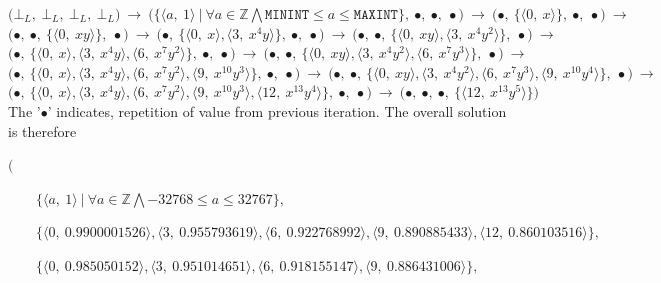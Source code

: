 \documentclass[final,3p, review, times]{Elsevier/elsarticle}
\begin{document}
\noindent
$
\bigg(\bot_L,\ \bot_L,\ \bot_L,\ \bot_L\bigg)\ \to\ 
\bigg(\Big\{\big\langle a,\ 1\big\rangle\ \big|\ \forall a\in\mathbb{Z}\bigwedge\mathtt{MININT}\leq a\leq\mathtt{MAXINT}\Big\},\ \bullet,\ \bullet,\ \bullet\bigg)\ \to\ 
\bigg(\bullet,\ \Big\{\big\langle 0,\ x\big\rangle\Big\},\ \bullet,\ \bullet\bigg)\ \to
$\\
$
\bigg(\bullet,\ \bullet,\ \Big\{\big\langle 0,\ xy\big\rangle\Big\},\ \bullet\bigg)\ \to\ 
\bigg(\bullet,\ \Big\{\big\langle 0,\ x\big\rangle,\big\langle 3,\ x^4y\big\rangle\Big\},\ \bullet,\ \bullet\bigg)\ \to\ 
\bigg(\bullet,\ \bullet,\ \Big\{\big\langle 0,\ xy\big\rangle,\big\langle 3,\ x^4y^2\big\rangle\Big\},\ \bullet\bigg)\ \to\ 
$\\
$
\bigg(\bullet,\ \Big\{\big\langle 0,\ x\big\rangle,\big\langle 3,\ x^4y\big\rangle,\big\langle 6,\ x^7y^2\big\rangle\Big\},\ \bullet,\ \bullet\bigg)\ \to\ 
\bigg(\bullet,\ \bullet,\ \Big\{\big\langle 0,\ xy\big\rangle,\big\langle 3,\ x^4y^2\big\rangle,\big\langle 6,\ x^7y^3\big\rangle\Big\},\ \bullet\bigg)\ \to\ 
$\\
$
\bigg(\bullet,\ \Big\{\big\langle 0,\ x\big\rangle,\big\langle 3,\ x^4y\big\rangle,\big\langle 6,\ x^7y^2\big\rangle,\big\langle 9,\ x^{10}y^3\big\rangle\Big\},\ \bullet,\ \bullet\bigg)\ \to\ 
\bigg(\bullet,\ \bullet,\ \Big\{\big\langle 0,\ xy\big\rangle,\big\langle 3,\ x^4y^2\big\rangle,\big\langle 6,\ x^7y^3\big\rangle,\big\langle 9,\ x^{10}y^4\big\rangle\Big\},\ \bullet\bigg)\ \to\ 
$\\
$
\bigg(\bullet,\ \Big\{\big\langle 0,\ x\big\rangle,\big\langle 3,\ x^4y\big\rangle,\big\langle 6,\ x^7y^2\big\rangle,\big\langle 9,\ x^{10}y^3\big\rangle,\big\langle 12,\ x^{13}y^4\big\rangle\Big\},\ \bullet,\ \bullet\bigg)\ \to\ 
\bigg(\bullet,\ \bullet,\ \bullet,\ \Big\{\big\langle 12,\ x^{13}y^5\big\rangle\Big\}\bigg)
$\\
       
The '$\bullet$' indicates, repetition of value from previous iteration. The overall solution is therefore

$\bigg($

$\qquad\Big\{\big\langle a,\ 1\big\rangle\ \big|\ \forall a\in\mathbb{Z}\bigwedge-32768\leq a\leq32767\Big\},
$

$\qquad\Big\{\big\langle 0,\ 0.9900001526\big\rangle,\big\langle 3,\ 0.955793619\big\rangle,\big\langle 6,\ 0.922768992\big\rangle,\big\langle 9,\ 0.890885433\big\rangle,\big\langle 12,\ 0.860103516\big\rangle\Big\},
$

$\qquad\Big\{\big\langle 0,\ 0.985050152\big\rangle,\big\langle 3,\ 0.951014651\big\rangle,\big\langle 6,\ 0.918155147\big\rangle,\big\langle 9,\ 0.886431006\big\rangle\Big\},
$
\end{document}
